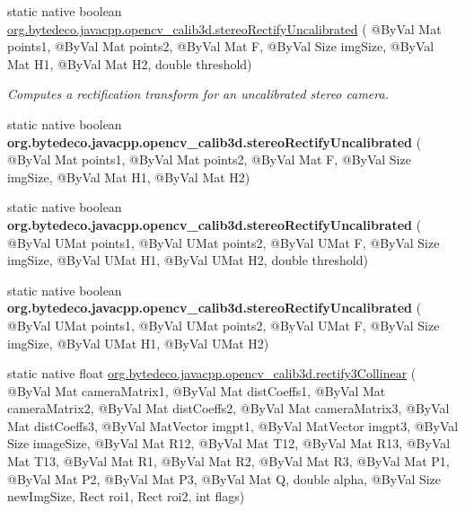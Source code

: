 \begin{DoxyCompactItemize}
\item 
static native boolean \hyperlink{group__calib3d_ga2a00c796082466a7d1000418118e02d2}{org.\+bytedeco.\+javacpp.\+opencv\+\_\+calib3d.\+stereo\+Rectify\+Uncalibrated} ( @By\+Val Mat points1, @By\+Val Mat points2, @By\+Val Mat F, @By\+Val Size img\+Size, @By\+Val Mat H1, @By\+Val Mat H2, double threshold)
\begin{DoxyCompactList}\small\item\em Computes a rectification transform for an uncalibrated stereo camera. \end{DoxyCompactList}\item 
\mbox{\label{group__calib3d_gae51ed9a742371e9fd093f4b5ee1e27d9}} 
static native boolean {\bfseries org.\+bytedeco.\+javacpp.\+opencv\+\_\+calib3d.\+stereo\+Rectify\+Uncalibrated} ( @By\+Val Mat points1, @By\+Val Mat points2, @By\+Val Mat F, @By\+Val Size img\+Size, @By\+Val Mat H1, @By\+Val Mat H2)
\item 
\mbox{\label{group__calib3d_gae5c58169fa1d21ee393876af9b8a9b0e}} 
static native boolean {\bfseries org.\+bytedeco.\+javacpp.\+opencv\+\_\+calib3d.\+stereo\+Rectify\+Uncalibrated} ( @By\+Val U\+Mat points1, @By\+Val U\+Mat points2, @By\+Val U\+Mat F, @By\+Val Size img\+Size, @By\+Val U\+Mat H1, @By\+Val U\+Mat H2, double threshold)
\item 
\mbox{\label{group__calib3d_ga60d699e8feea67069a80042af331688f}} 
static native boolean {\bfseries org.\+bytedeco.\+javacpp.\+opencv\+\_\+calib3d.\+stereo\+Rectify\+Uncalibrated} ( @By\+Val U\+Mat points1, @By\+Val U\+Mat points2, @By\+Val U\+Mat F, @By\+Val Size img\+Size, @By\+Val U\+Mat H1, @By\+Val U\+Mat H2)
\item 
static native float \hyperlink{group__calib3d_ga44e3e2ed99710a5b0679459a2988bbd9}{org.\+bytedeco.\+javacpp.\+opencv\+\_\+calib3d.\+rectify3\+Collinear} ( @By\+Val Mat camera\+Matrix1, @By\+Val Mat dist\+Coeffs1, @By\+Val Mat camera\+Matrix2, @By\+Val Mat dist\+Coeffs2, @By\+Val Mat camera\+Matrix3, @By\+Val Mat dist\+Coeffs3, @By\+Val Mat\+Vector imgpt1, @By\+Val Mat\+Vector imgpt3, @By\+Val Size image\+Size, @By\+Val Mat R12, @By\+Val Mat T12, @By\+Val Mat R13, @By\+Val Mat T13, @By\+Val Mat R1, @By\+Val Mat R2, @By\+Val Mat R3, @By\+Val Mat P1, @By\+Val Mat P2, @By\+Val Mat P3, @By\+Val Mat Q, double alpha, @By\+Val Size new\+Img\+Size, Rect roi1, Rect roi2, int flags)

\end{DoxyCompactItemize}
